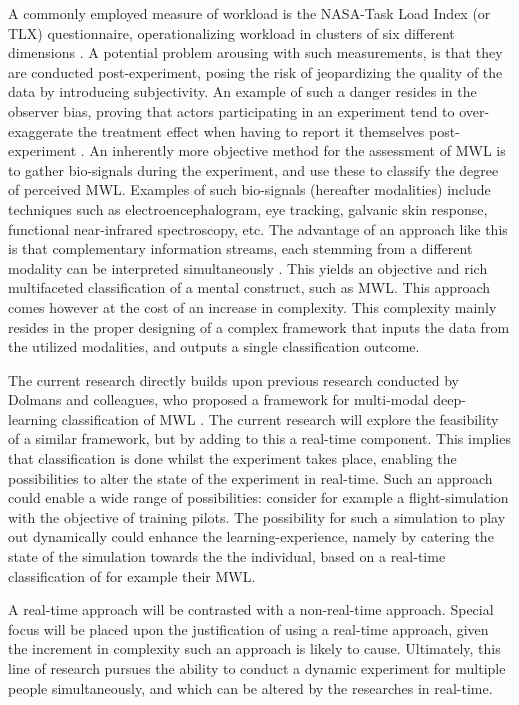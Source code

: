 \documentclass{article}
\begin{document}
A commonly employed measure of workload is the NASA-Task Load Index (or TLX) questionnaire, operationalizing workload in clusters of six different dimensions \cite{hart2006nasa}. A potential problem arousing with such measurements, is that they are conducted post-experiment, posing the risk of jeopardizing the quality of the data by introducing subjectivity. An example of such a danger resides in the observer bias, proving that actors participating in an experiment tend to over-exaggerate the treatment effect when having to report it themselves post-experiment \cite{mahtani2018catalogue}. An inherently more objective method for the assessment of MWL is to gather bio-signals during the experiment, and use these to classify the degree of perceived MWL. Examples of such bio-signals (hereafter modalities) include techniques such as electroencephalogram, eye tracking, galvanic skin response, functional near-infrared spectroscopy, etc. The advantage of an approach like this is that complementary information streams, each stemming from a different modality can be interpreted simultaneously \cite{ramachandram2017deep}. This yields an objective and rich multifaceted classification of a mental construct, such as MWL. This approach comes however at the cost of an increase in complexity. This complexity mainly resides in the proper designing of a complex framework that inputs the data from the utilized modalities, and outputs a single classification outcome. 

The current research directly builds upon previous research conducted by Dolmans and colleagues, who proposed a framework for multi-modal deep-learning classification of MWL \cite{dolmans2020perceived}. The current research will explore the feasibility of a similar framework, but by adding to this a real-time component. This implies that classification is done whilst the experiment takes place, enabling the possibilities to alter the state of the experiment in real-time. Such an approach could enable a wide range of possibilities: consider for example a flight-simulation with the objective of training pilots. The possibility for such a simulation to play out dynamically could enhance the learning-experience, namely by catering the state of the simulation towards the the individual, based on a real-time classification of for example their MWL.

A real-time approach will be contrasted with a non-real-time approach. Special focus will be placed upon the justification of using a real-time approach, given the increment in complexity such an approach is likely to cause. Ultimately, this line of research pursues the ability to conduct a dynamic experiment for multiple people simultaneously, and which can be altered by the researches in real-time. 
\end{document}
